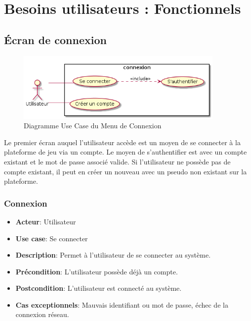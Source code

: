 \documentclass{article}
\begin{document}
\newpage

\section{Besoins utilisateurs : Fonctionnels}

\subsection{Écran de connexion}

\begin{figure}[!h]
    \centering
    	\includegraphics[width=0.9\textwidth]{../../res/uml/usecase/ConnexionUseCase.png}
    	\caption{Diagramme Use Case du Menu de Connexion}
    	\label{fig:main-menu}
\end{figure}
Le premier écran auquel l'utilisateur accède est un moyen de se connecter à la plateforme de jeu via un compte. Le moyen de s'authentifier est avec un compte existant et le mot de passe associé valide. Si l'utilisateur ne possède pas de compte existant, il peut en créer un nouveau avec un pseudo non existant sur la plateforme.


\subsubsection*{Connexion}
\begin{itemize}
    \item \textbf{Acteur}: Utilisateur
    \item \textbf{Use case}: Se connecter
    \item \textbf{Description}: Permet à l'utilisateur de se connecter au système.
    \item \textbf{Précondition}: L'utilisateur possède déjà un compte.
    \item \textbf{Postcondition}: L'utilisateur est connecté au système.
    \item \textbf{Cas exceptionnels}: Mauvais identifiant ou mot de passe, échec de la connexion réseau.
\end{itemize}
\end{document}
